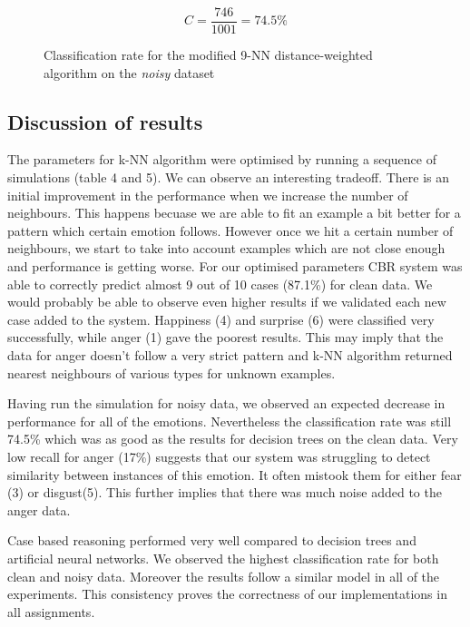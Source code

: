 \documentclass[a4paper]{article}
\begin{document}
\begin{figure}[H]
\[ C = \frac{746}{1001} = 74.5\% \]
\caption{Classification rate for the modified 9-NN distance-weighted algorithm on the \emph{noisy} dataset}
\end{figure}

\subsection{Discussion of results}

The parameters for k-NN algorithm were optimised by running a sequence of simulations (table 4 and 5). We can observe an interesting tradeoff. There is an initial improvement in the performance when we increase the number of neighbours. This happens becuase we are able to fit an example a bit better for a pattern which certain emotion follows. However once we hit a certain number of neighbours, we start to take into account examples which are not close enough and performance is getting worse. For our optimised parameters CBR system was able to correctly predict almost 9 out of 10 cases (87.1\%) for clean data. We would probably be able to observe even higher results if we validated each new case added to the system. Happiness (4) and surprise (6) were classified very successfully, while anger (1) gave the poorest results. This may imply that the data for anger doesn't follow a very strict pattern and k-NN algorithm returned nearest neighbours of various types for unknown examples. \medskip

Having run the simulation for noisy data, we observed an expected decrease in performance for all of the emotions. Nevertheless the classification rate was still 74.5\% which was as good as the results for decision trees on the clean data. Very low recall for anger (17\%) suggests that our system was struggling to detect similarity between instances of this emotion. It often mistook them for either fear (3) or disgust(5). This further implies that there was much noise added to the anger data. \medskip

Case based reasoning performed very well compared to decision trees and artificial neural networks. We observed the highest classification rate for both clean and noisy data. Moreover the results follow a similar model in all of the experiments. This consistency proves the correctness of our implementations in all assignments.

\clearpage

\end{document}
